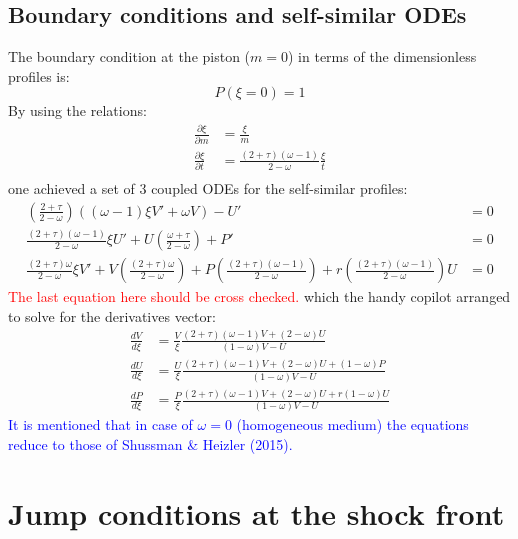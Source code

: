 \documentclass[11pt]{article}
\begin{document}
\subsection{Boundary conditions and self-similar ODEs}
The boundary condition at the piston ($m=0$) in terms of the dimensionless profiles is:
\begin{equation}
    P(\xi=0) = 1
\end{equation}
By using the relations:
\begin{equation}
    \begin{aligned}
        \frac{\partial \xi}{\partial m} &= \frac{\xi}{m} \\
        \frac{\partial \xi}{\partial t} &= \frac{(2+\tau)(\omega - 1)}{2-\omega} \frac{\xi}{t} \\
    \end{aligned}
\end{equation}
one achieved a set of 3 coupled ODEs for the self-similar profiles:
\begin{align}
    \left(\frac{2+\tau}{2-\omega}\right)\left((\omega-1)\xi V' +\omega V\right)-U' &= 0 \\
    \frac{(2+\tau)(\omega - 1)}{2-\omega}\xi U' + U\left(\frac{\omega + \tau}{2-\omega}\right)+P' &= 0 \\
    \frac{(2+\tau)\omega}{2-\omega}\xi V' + V\left(\frac{(2+\tau)\omega}{2-\omega}\right) + P\left(\frac{(2+\tau)(\omega - 1)}{2-\omega}\right) + r\left(\frac{(2+\tau)(\omega - 1)}{2-\omega}\right) U &= 0
\end{align}
\textcolor{red}{The last equation here should be cross checked.}
which the handy copilot arranged to solve for the derivatives vector:
\begin{align}
    \frac{dV}{d\xi} &= \frac{V}{\xi} \frac{(2+\tau)(\omega - 1) V + (2-\omega) U}{(1-\omega) V - U} \\
    \frac{dU}{d\xi} &= \frac{U}{\xi} \frac{(2+\tau)(\omega - 1) V + (2-\omega) U + (1-\omega) P}{(1-\omega) V - U} \\
    \frac{dP}{d\xi} &= \frac{P}{\xi} \frac{(2+\tau)(\omega - 1) V + (2-\omega) U + r(1-\omega) U}{(1-\omega) V - U}
\end{align}
\textcolor{blue}{It is mentioned that in case of $\omega=0$ (homogeneous medium) the equations reduce to those of Shussman \& Heizler (2015).}
\section{Jump conditions at the shock front}
\end{document}
